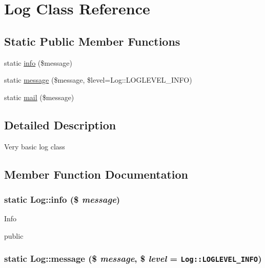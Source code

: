 \hypertarget{classLog}{
\section{Log Class Reference}
\label{classLog}
}
\subsection*{Static Public Member Functions}
\begin{CompactItemize}
\item 
static \hyperlink{classLog_ff111228ff1ed870f74b7ff4720a35ab}{info} (\$message)
\item 
static \hyperlink{classLog_f03ad84515c043e7acd665e5b9563f17}{message} (\$message, \$level=Log::LOGLEVEL\_\-INFO)
\item 
static \hyperlink{classLog_07af3a27afec258b5107778f7181e05b}{mail} (\$message)
\end{CompactItemize}


\subsection{Detailed Description}
Very basic log class 

\subsection{Member Function Documentation}
\hypertarget{classLog_ff111228ff1ed870f74b7ff4720a35ab}{
\subsubsection[info]{\setlength{\rightskip}{0pt plus 5cm}static Log::info (\$ {\em message})}}
\label{classLog_ff111228ff1ed870f74b7ff4720a35ab}


Info

public \hypertarget{classLog_f03ad84515c043e7acd665e5b9563f17}{
\subsubsection[message]{\setlength{\rightskip}{0pt plus 5cm}static Log::message (\$ {\em message}, \/  \$ {\em level} = {\tt Log::LOGLEVEL\_\-INFO})}}
\label{classLog_f03ad84515c043e7acd665e5b9563f17}


